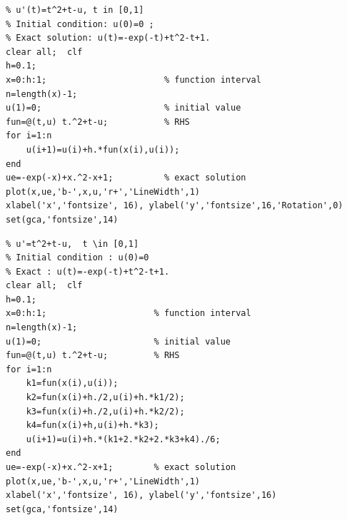 \documentclass[12pt,cn]{homework}
\begin{document}
\begin{lstlisting}[title={Euler method}]
% Euler method for the ODE model
% u'(t)=t^2+t-u, t in [0,1]
% Initial condition: u(0)=0 ;
% Exact solution: u(t)=-exp(-t)+t^2-t+1.
clear all;  clf
h=0.1;
x=0:h:1;                       % function interval
n=length(x)-1;
u(1)=0;                        % initial value
fun=@(t,u) t.^2+t-u;           % RHS
for i=1:n
    u(i+1)=u(i)+h.*fun(x(i),u(i));
end
ue=-exp(-x)+x.^2-x+1;          % exact solution
plot(x,ue,'b-',x,u,'r+','LineWidth',1)
xlabel('x','fontsize', 16), ylabel('y','fontsize',16,'Rotation',0)
set(gca,'fontsize',14)
\end{lstlisting}


\begin{lstlisting}[title={Runge-Kutta method}]
% Runge-Kutta method for the ODE model
% u'=t^2+t-u,  t \in [0,1]
% Initial condition : u(0)=0
% Exact : u(t)=-exp(-t)+t^2-t+1.
clear all;  clf
h=0.1;
x=0:h:1;                     % function interval
n=length(x)-1;
u(1)=0;                      % initial value
fun=@(t,u) t.^2+t-u;         % RHS
for i=1:n
    k1=fun(x(i),u(i));
    k2=fun(x(i)+h./2,u(i)+h.*k1/2);
    k3=fun(x(i)+h./2,u(i)+h.*k2/2);
    k4=fun(x(i)+h,u(i)+h.*k3);
    u(i+1)=u(i)+h.*(k1+2.*k2+2.*k3+k4)./6;
end
ue=-exp(-x)+x.^2-x+1;        % exact solution
plot(x,ue,'b-',x,u,'r+','LineWidth',1)
xlabel('x','fontsize', 16), ylabel('y','fontsize',16)
set(gca,'fontsize',14)
\end{lstlisting}
\end{document}
